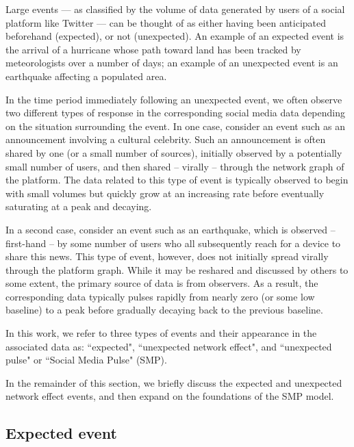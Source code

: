 \documentclass{article}
\begin{document}
Large events --- as classified by the volume of data generated by users of a social platform like Twitter --- can be thought of as either having been anticipated beforehand (expected), or not (unexpected). An example of an expected event is the arrival of a hurricane whose path toward land has been tracked by meteorologists over a number of days; an example of an unexpected event is an earthquake affecting a populated area. 

In the time period immediately following an unexpected event, we often observe two different types of response in the corresponding social media data depending on the situation surrounding the event. In one case, consider an event such as an announcement involving a cultural celebrity. Such an announcement is often shared by one (or a small number of sources), initially observed by a potentially small number of users, and then shared -- virally -- through the network graph of the platform. The data related to this type of event is typically observed to begin with small volumes but quickly grow at an increasing rate before eventually saturating at a peak and decaying. 

In a second case, consider an event such as an earthquake, which is observed -- first-hand -- by some number of users who all subsequently reach for a device to share this news. This type of event, however, does not initially spread virally through the platform graph. While it may be reshared and discussed by others to some extent, the primary source of data is from observers. As a result, the corresponding data typically pulses rapidly from nearly zero (or some low baseline) to a peak before gradually decaying back to the previous baseline. 

In this work, we refer to three types of events and their appearance in the associated data as: ``expected", ``unexpected network effect", and ``unexpected pulse" or ``Social Media Pulse" (SMP). 

In the remainder of this section, we briefly discuss the expected and unexpected network effect events, and then expand on the foundations of the SMP model. 


\subsection{Expected event}
\label{sec:models_ex}
\end{document}
